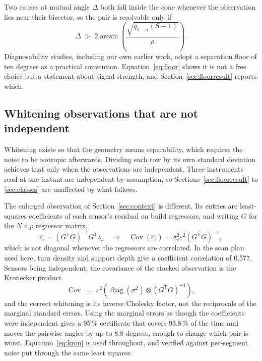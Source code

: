 \documentclass[preprint,12pt]{elsarticle}
\begin{document}
Two causes at mutual angle $\Delta$ both fall inside the cone whenever the
observation lies near their bisector, so the pair is resolvable only if
%
\begin{equation}
\Delta \;>\; 2\arcsin\!\left(\frac{\sqrt{q_{1-\alpha}(S-1)}}{\rho}\right).
\label{eq:floor}
\end{equation}
%
Diagnosability studies, including our own earlier work, adopt a separation floor
of ten degrees as a practical convention. Equation~\eqref{eq:floor} shows it is
not a free choice but a statement about signal strength, and
Section~\ref{sec:floorresult} reports which.

\subsection{Whitening observations that are not independent}
\label{sec:whiten}

Whitening exists so that the geometry means separability, which requires the
noise to be isotropic afterwards. Dividing each row by its own standard
deviation achieves that only when the observations are independent. Three
instruments read at one instant are independent by assumption, so
Sections~\ref{sec:floorresult} to \ref{sec:classes} are unaffected by what
follows.

The enlarged observation of Section~\ref{sec:context} is different. Its entries
are least-squares coefficients of each sensor's residual on build regressors,
and writing $G$ for the $N \times p$ regressor matrix,
%
\begin{equation}
\hat c_s = (G^{\mathsf T}G)^{-1}G^{\mathsf T} z_s
\quad\Longrightarrow\quad
\operatorname{Cov}(\hat c_s) = \sigma_s^2 \varepsilon^2 (G^{\mathsf T}G)^{-1},
\end{equation}
%
which is not diagonal whenever the regressors are correlated. In the scan plan
used here, turn density and support depth give a coefficient correlation of
0.577. Sensors being independent, the covariance of the stacked observation is
the Kronecker product
%
\begin{equation}
\operatorname{Cov} \;=\; \varepsilon^2
\left( \operatorname{diag}(\sigma^2) \otimes (G^{\mathsf T}G)^{-1} \right),
\label{eq:kron}
\end{equation}
%
and the correct whitening is its inverse Cholesky factor, not the reciprocals of
the marginal standard errors. Using the marginal errors as though the
coefficients were independent gives a 95\,\% certificate that covers 93.8\,\% of
the time and moves the pairwise angles by up to 8.8 degrees, enough to change
which pair is worst. Equation~\eqref{eq:kron} is used throughout, and verified
against per-segment noise put through the same least squares.
\end{document}
